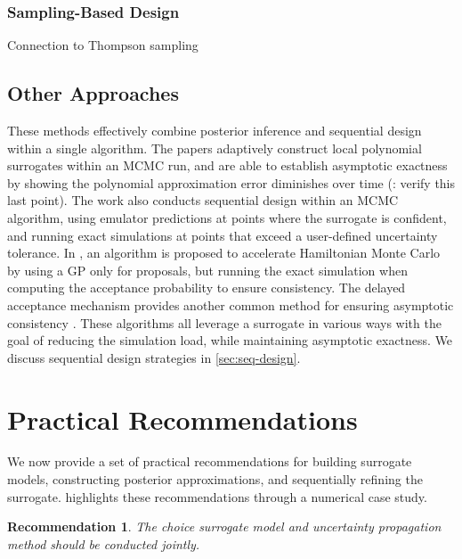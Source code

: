 \documentclass[12pt]{article}
\newtheorem{rec}{Recommendation}
\begin{document}
\subsubsection{Sampling-Based Design}
Connection to Thompson sampling

\subsection{Other Approaches}
These methods effectively combine posterior
inference and sequential design within a single algorithm.
The papers \citet{Li_2014,ConradLocalExactMCMC} 
adaptively construct local polynomial surrogates within an MCMC run, and are able to establish asymptotic 
exactness by showing the polynomial 
approximation error diminishes over time (\todo: verify this last point). The work \citep{ActiveLearningMCMC}
also conducts sequential design within an MCMC algorithm, using emulator predictions at points where the 
surrogate is confident, and running exact simulations at points that exceed a user-defined uncertainty tolerance.
In \citet{MCMC_GP_proposal}, an algorithm is proposed to accelerate Hamiltonian Monte Carlo by using a 
GP only for proposals, but running the exact simulation when computing the acceptance probability to 
ensure consistency. The delayed acceptance mechanism provides another common method for ensuring
asymptotic consistency \citep{DelayedAcceptance}.
These algorithms all leverage a surrogate in various ways with the goal of reducing the simulation load, while
maintaining asymptotic exactness. We discuss sequential design strategies in \cref{sec:seq-design}.

\section{Practical Recommendations} \label{sec:recs}
We now provide a set of practical recommendations for building surrogate models, constructing
posterior approximations, and sequentially refining the surrogate. 
highlights these recommendations through a numerical case study.

\begin{rec} \label{rec:prop-uncertainty}
The choice surrogate model and uncertainty propagation method should be conducted jointly.
\end{rec}
\end{document}
